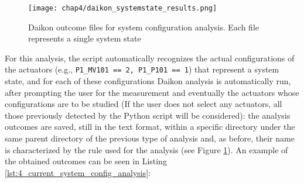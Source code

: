 \begin{figure}[H]
	\centering
	\texttt{[image: chap4/daikon\_systemstate\_results.png]}
	\caption{Daikon outcome files for system configuration analysis. Each file represents a single system state}
	\label{fig:4_daikon_systemstates_files}
\end{figure}

For this analysis, the script automatically recognizes the actual configurations of the actuators (e.g., \texttt{P1\_MV101 == 2, P1\_P101 == 1}) that represent a system state, and for each of these configurations  Daikon analysis is automatically run, after prompting the user for the measurement and eventually the actuators whose configurations are to be studied (If the user does not select any actuators, all those previously detected by the Python script will be considered): the analysis outcomes are saved, still in the text format, within a specific directory under the same parent directory of the previous type of analysis and, as before, their name is characterized by the rule used for the analysis (see Figure \ref{fig:4_daikon_systemstates_files}).\newline \newline
An example of the obtained outcomes can be seen in Listing \ref{lst:4_current_system_config_analysis}:

